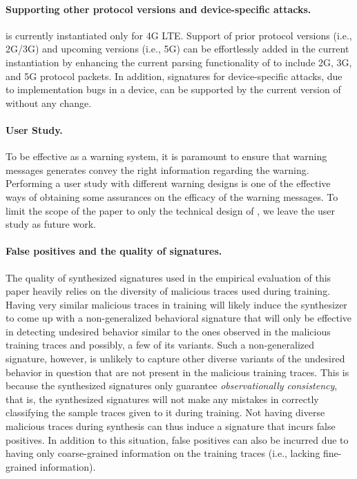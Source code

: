 
\paragraph{Supporting other protocol versions and device-specific attacks.}
\system is currently instantiated only for 4G LTE. Support of prior protocol
versions  (i.e., 2G/3G) and upcoming versions (i.e., 5G) can be effortlessly
added in the current instantiation by enhancing the current parsing
functionality of \system to include 2G, 3G, and 5G protocol packets. In addition,
signatures for device-specific attacks, due to implementation bugs in a device,
can be supported by the current version of
\system without any change.

\paragraph{User Study.} To be effective as a warning system,
it is paramount to ensure that warning messages \system generates
convey the right information regarding the warning. Performing
a user study with different warning designs is one of the effective
ways of obtaining some assurances on the efficacy of the warning messages.
To limit the scope of the paper to only the technical design of \system,
we leave the user study as future work.

\paragraph{False positives and the quality of signatures.}
The quality of synthesized signatures used in the empirical evaluation
of this paper heavily relies on the diversity of malicious traces used during training.
Having very similar malicious traces in training will likely induce the synthesizer
to come up with a non-generalized behavioral signature that will only be
effective in detecting undesired behavior similar to the ones observed in the malicious training traces and possibly,
a few of its variants. Such a non-generalized signature, however, is
unlikely to capture other diverse variants of the undesired behavior in question that are not present in the
malicious training traces.
This is because the synthesized signatures only guarantee \emph{observationally consistency},
that is, the synthesized signatures will not make any mistakes in correctly
classifying the sample traces given to it during training. Not having diverse
malicious traces during synthesis can thus induce a signature that incurs
false positives. In addition to this situation, false positives can also be incurred due to
having only coarse-grained information on the training traces (i.e., lacking fine-grained information).

